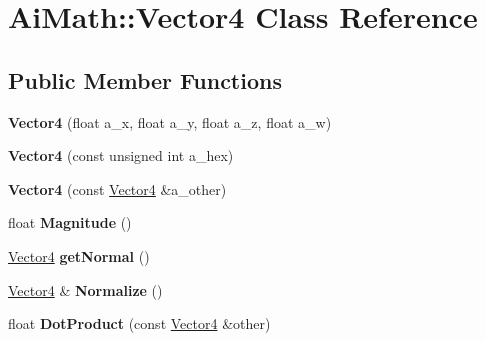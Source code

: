 \hypertarget{class_ai_math_1_1_vector4}{\section{Ai\+Math\+:\+:Vector4 Class Reference}
\label{class_ai_math_1_1_vector4}
}
\subsection*{Public Member Functions}
\begin{DoxyCompactItemize}
\item 
\hypertarget{class_ai_math_1_1_vector4_ac532206caebf7a6378f659f862f1536b}{{\bfseries Vector4} (float a\+\_\+x, float a\+\_\+y, float a\+\_\+z, float a\+\_\+w)}\label{class_ai_math_1_1_vector4_ac532206caebf7a6378f659f862f1536b}

\item 
\hypertarget{class_ai_math_1_1_vector4_aae099515772fa52fa3f1841e7e61bfcf}{{\bfseries Vector4} (const unsigned int a\+\_\+hex)}\label{class_ai_math_1_1_vector4_aae099515772fa52fa3f1841e7e61bfcf}

\item 
\hypertarget{class_ai_math_1_1_vector4_a8ace62b38d1387cad2ad6d2c1bf55c62}{{\bfseries Vector4} (const \hyperlink{class_ai_math_1_1_vector4}{Vector4} \&a\+\_\+other)}\label{class_ai_math_1_1_vector4_a8ace62b38d1387cad2ad6d2c1bf55c62}

\item 
\hypertarget{class_ai_math_1_1_vector4_a62f02aac3323b3011b55178aab6e51e9}{float {\bfseries Magnitude} ()}\label{class_ai_math_1_1_vector4_a62f02aac3323b3011b55178aab6e51e9}

\item 
\hypertarget{class_ai_math_1_1_vector4_a9696e8c5db47a97ada36922457eb0a6f}{\hyperlink{class_ai_math_1_1_vector4}{Vector4} {\bfseries get\+Normal} ()}\label{class_ai_math_1_1_vector4_a9696e8c5db47a97ada36922457eb0a6f}

\item 
\hypertarget{class_ai_math_1_1_vector4_a19e9442b40f987f62010fcf847d55421}{\hyperlink{class_ai_math_1_1_vector4}{Vector4} \& {\bfseries Normalize} ()}\label{class_ai_math_1_1_vector4_a19e9442b40f987f62010fcf847d55421}

\item 
\hypertarget{class_ai_math_1_1_vector4_ac136139bae3e45132d11865ad889c5ee}{float {\bfseries Dot\+Product} (const \hyperlink{class_ai_math_1_1_vector4}{Vector4} \&other)}\label{class_ai_math_1_1_vector4_ac136139bae3e45132d11865ad889c5ee}


\end{DoxyCompactItemize}
